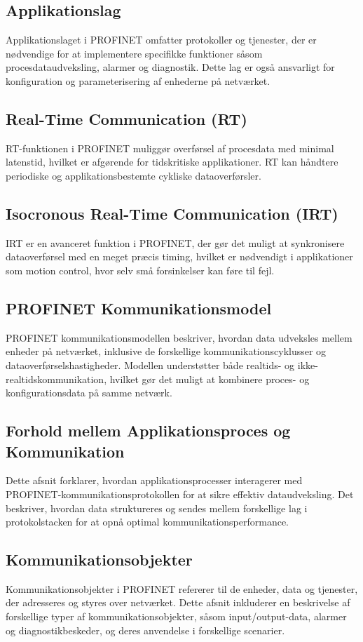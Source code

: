 \subsection*{Applikationslag}
Applikationslaget i PROFINET omfatter protokoller og tjenester, der er nødvendige for at implementere specifikke funktioner såsom procesdataudveksling, alarmer og diagnostik. Dette lag er også ansvarligt for konfiguration og parameterisering af enhederne på netværket.

\subsection*{Real-Time Communication (RT)}
RT-funktionen i PROFINET muliggør overførsel af procesdata med minimal latenstid, hvilket er afgørende for tidskritiske applikationer. RT kan håndtere periodiske og applikationsbestemte cykliske dataoverførsler.

\subsection*{Isocronous Real-Time Communication (IRT)}
IRT er en avanceret funktion i PROFINET, der gør det muligt at synkronisere dataoverførsel med en meget præcis timing, hvilket er nødvendigt i applikationer som motion control, hvor selv små forsinkelser kan føre til fejl.

\subsection{PROFINET Kommunikationsmodel}
PROFINET kommunikationsmodellen beskriver, hvordan data udveksles mellem enheder på netværket, inklusive de forskellige kommunikationscyklusser og dataoverførselshastigheder. Modellen understøtter både realtids- og ikke-realtidskommunikation, hvilket gør det muligt at kombinere proces- og konfigurationsdata på samme netværk.

\subsection{Forhold mellem Applikationsproces og Kommunikation}
Dette afsnit forklarer, hvordan applikationsprocesser interagerer med PROFINET-kommunikationsprotokollen for at sikre effektiv dataudveksling. Det beskriver, hvordan data struktureres og sendes mellem forskellige lag i protokolstacken for at opnå optimal kommunikationsperformance.

\subsection{Kommunikationsobjekter}
Kommunikationsobjekter i PROFINET refererer til de enheder, data og tjenester, der adresseres og styres over netværket. Dette afsnit inkluderer en beskrivelse af forskellige typer af kommunikationsobjekter, såsom input/output-data, alarmer og diagnostikbeskeder, og deres anvendelse i forskellige scenarier.

